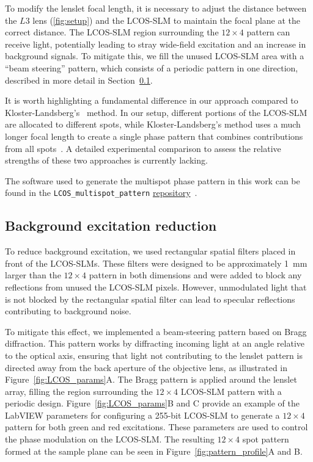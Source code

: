 To modify the lenslet focal length, it is necessary to adjust the distance between the $L3$ lens (\ref{fig:setup}) and the \ac{LCOS-SLM} to maintain the focal plane at the correct distance. 
The \ac{LCOS-SLM} region surrounding the $12\times4$ pattern can receive light, potentially leading to stray wide-field excitation and an increase in background signals. 
To mitigate this, we fill the unused \ac{LCOS-SLM} area with a \enquote{beam steering} pattern, which consists of a periodic pattern in one direction, described in more detail in Section~\ref{sec:background_suppression}. 

It is worth highlighting a fundamental difference in our approach compared to Kloster-Landsberg's~\cite {kloster-landsberg_RSI_2013} method. 
In our setup, different portions of the \ac{LCOS-SLM} are allocated to different spots, while Kloster-Landsberg's method uses a much longer focal length to create a single phase pattern that combines contributions from all spots~\cite{kloster-landsberg_RSI_2013}. 
A detailed experimental comparison to assess the relative strengths of these two approaches is currently lacking.

The software used to generate the multispot phase pattern in this work can be found in the \texttt{LCOS\_multispot\_pattern} \href{https://github.com/ multispot-software}{repository}~\cite{ingargiola_JCP_2018}.

\subsection{Background excitation reduction}
\label{sec:background_suppression}

To reduce background excitation, we used rectangular spatial filters placed in front of the \ac{LCOS-SLM}s. 
These filters were designed to be approximately 1~mm larger than the $12\times4$ pattern in both dimensions and were added to block any reflections from unused the \ac{LCOS-SLM} pixels.
However, unmodulated light that is not blocked by the rectangular spatial filter can lead to specular reflections contributing to background noise.

To mitigate this effect, we implemented a beam-steering pattern based on Bragg diffraction. 
This pattern works by diffracting incoming light at an angle relative to the optical axis, ensuring that light not contributing to the lenslet pattern is directed away from the back aperture of the objective lens, as illustrated in Figure~\ref{fig:LCOS_params}A.
The Bragg pattern is applied around the lenslet array, filling the region surrounding the $12\times4$ \ac{LCOS-SLM} pattern with a periodic design. 
Figure~\ref{fig:LCOS_params}B and C provide an example of the LabVIEW parameters for configuring a 255-bit \ac{LCOS-SLM} to generate a $12\times4$ pattern for both green and red excitations.
These parameters are used to control the phase modulation on the \ac{LCOS-SLM}.
The resulting $12\times4$ spot pattern formed at the sample plane can be seen in Figure~\ref{fig:pattern_profile}A and B.

